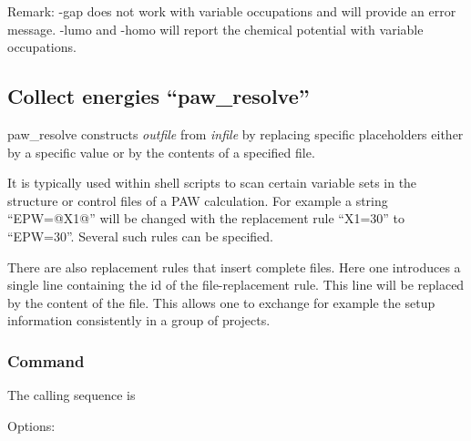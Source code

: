 \documentclass[final,12pt]{article}
\begin{document}
{{{{{{Remark: -gap does not work with variable occupations and will provide
an error message. -lumo and -homo will report the chemical potential
with variable occupations.
%
\subsection{Collect energies ``paw\_resolve''}
paw\_resolve constructs \textit{outfile} from \textit{infile} by
replacing specific placeholders either by a specific value or by the
contents of a specified file. 

It is typically used within shell scripts to scan certain variable
sets in the structure or control files of a PAW calculation.  For
example a string ``EPW=@X1@'' will be changed with the replacement
rule ``X1=30'' to ``EPW=30''. Several such rules can be specified.

There are also replacement rules that insert complete files. Here one
introduces a single line containing the id of the file-replacement
rule.  This line will be replaced by the content of the file. This
allows one to exchange for example the setup information consistently
in a group of projects.

\subsubsection{Command}
The calling sequence is

\bigskip{}
\vspace{0.5cm}

\noindent Options:\\[2mm]
\hspace*{1cm}
\bigskip
%
}}}}}}
\end{document}
